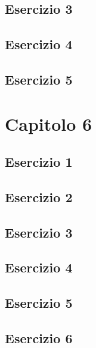 \documentclass[a4paper,12pt,oneside]{book}
\begin{document}
\hypertarget{esercizio-3-2}{%
\subsection{Esercizio 3}\label{esercizio-3-2}}

\hypertarget{esercizio-4-1}{%
\subsection{Esercizio 4}\label{esercizio-4-1}}

\hypertarget{esercizio-5-1}{%
\subsection{Esercizio 5}\label{esercizio-5-1}}

\hypertarget{capitolo-6}{%
\section{Capitolo 6}\label{capitolo-6}}

\hypertarget{esercizio-1-4}{%
\subsection{Esercizio 1}\label{esercizio-1-4}}

\hypertarget{esercizio-2-3}{%
\subsection{Esercizio 2}\label{esercizio-2-3}}

\hypertarget{esercizio-3-3}{%
\subsection{Esercizio 3}\label{esercizio-3-3}}

\hypertarget{esercizio-4-2}{%
\subsection{Esercizio 4}\label{esercizio-4-2}}

\hypertarget{esercizio-5-2}{%
\subsection{Esercizio 5}\label{esercizio-5-2}}

\hypertarget{esercizio-6-1}{%
\subsection{Esercizio 6}\label{esercizio-6-1}}
\end{document}
